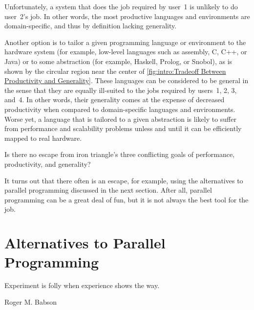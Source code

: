 \QuickQuizEnd

Unfortunately, a system that does the job required by user~1 is
unlikely to do user~2's job.
In other words, the most productive languages and environments are
domain-specific, and thus by definition lacking generality.

Another option is to tailor a given programming language or environment
to the hardware system (for example, low-level languages such as
assembly, C, C++, or Java) or to some abstraction (for example,
Haskell, Prolog, or Snobol), as is shown by the circular region near
the center of
\cref{fig:intro:Tradeoff Between Productivity and Generality}.
These languages can be considered to be general in the sense that they
are equally ill-suited to the jobs required by users~1, 2, 3, and~4.
In other words, their generality comes at the expense of
decreased productivity when compared to domain-specific languages
and environments.
Worse yet, a language that is tailored to a given abstraction
is likely to suffer from performance and scalability problems
unless and until it can be efficiently mapped to real hardware.

Is there no escape from iron triangle's three conflicting goals of
performance, productivity, and generality?

It turns out that there often is an escape, for example,
using the alternatives to parallel programming discussed in the next section.
After all, parallel programming can be a great deal of fun, but
it is not always the best tool for the job.

\section{Alternatives to Parallel Programming}
\label{sec:intro:Alternatives to Parallel Programming}
%
\epigraph{Experiment is folly when experience shows the way.}
	 {Roger M. Babson}

